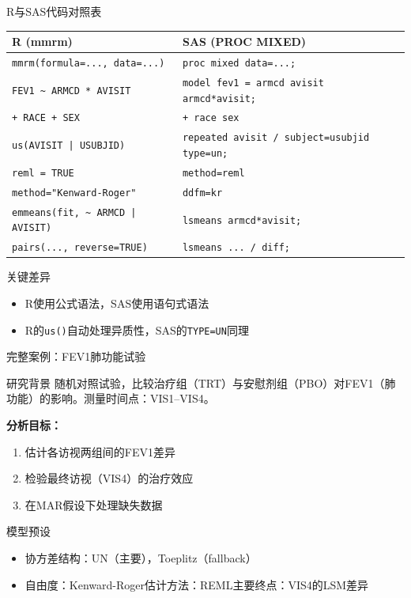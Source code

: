 \documentclass[aspectratio=169,11pt]{beamer}
\begin{document}
\begin{frame}{R与SAS代码对照表}
\begin{center}
\small
\begin{tabular}{p{5.5cm}p{5.5cm}}
\toprule
\textbf{R (mmrm)} & \textbf{SAS (PROC MIXED)} \\
\midrule
\texttt{mmrm(formula=..., data=...)} & \texttt{proc mixed data=...;} \\
\texttt{FEV1 \textasciitilde\ ARMCD * AVISIT} & \texttt{model fev1 = armcd avisit armcd*avisit;} \\
\texttt{+ RACE + SEX} & \texttt{+ race sex} \\
\texttt{us(AVISIT | USUBJID)} & \texttt{repeated avisit / subject=usubjid type=un;} \\
\texttt{reml = TRUE} & \texttt{method=reml} \\
\texttt{method="Kenward-Roger"} & \texttt{ddfm=kr} \\
\texttt{emmeans(fit, \textasciitilde\ ARMCD | AVISIT)} & \texttt{lsmeans armcd*avisit;} \\
\texttt{pairs(..., reverse=TRUE)} & \texttt{lsmeans ... / diff;} \\
\bottomrule
\end{tabular}
\end{center}

\vspace{0.2cm}
\begin{exampleblock}{关键差异}
\begin{itemize}
    \item R使用公式语法，SAS使用语句式语法
    \item R的\texttt{us()}自动处理异质性，SAS的\texttt{TYPE=UN}同理
\end{itemize}
\end{exampleblock}
\end{frame}

\begin{frame}{完整案例：FEV1肺功能试验}
\begin{block}{研究背景}
随机对照试验，比较治疗组（TRT）与安慰剂组（PBO）对FEV1（肺功能）的影响。测量时间点：VIS1--VIS4。
\end{block}

\textbf{分析目标：}
\begin{enumerate}
    \item 估计各访视两组间的FEV1差异
    \item 检验最终访视（VIS4）的治疗效应
    \item 在MAR假设下处理缺失数据
\end{enumerate}

\vspace{0.1cm}
\begin{alertblock}{模型预设}
\begin{itemize}
    \item 协方差结构：UN（主要），Toeplitz（fallback）
    \item 自由度：Kenward-Roger\quad 估计方法：REML\quad 主要终点：VIS4的LSM差异
\end{itemize}
\end{alertblock}
\end{frame}
\end{document}
